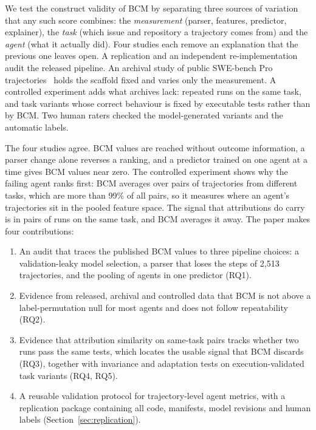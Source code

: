 \documentclass[conference]{IEEEtran}
\newcommand{\bcm}{\textsc{BCM}}
\begin{document}
We test the construct validity of \bcm{} by separating three sources of variation that any such score combines: the \emph{measurement} (parser, features, predictor, explainer), the \emph{task} (which issue and repository a trajectory comes from) and the \emph{agent} (what it actually did). Four studies each remove an explanation that the previous one leaves open. A replication and an independent re-implementation audit the released pipeline. An archival study of public SWE-bench Pro trajectories~\cite{deng2025swebenchpro} holds the scaffold fixed and varies only the measurement. A controlled experiment adds what archives lack: repeated runs on the same task, and task variants whose correct behaviour is fixed by executable tests rather than by \bcm. Two human raters checked the model-generated variants and the automatic labels.

The four studies agree. \bcm{} values are reached without outcome information, a parser change alone reverses a ranking, and a predictor trained on one agent at a time gives \bcm{} values near zero. The controlled experiment shows why the failing agent ranks first: \bcm{} averages over pairs of trajectories from different tasks, which are more than 99\% of all pairs, so it measures where an agent's trajectories sit in the pooled feature space. The signal that attributions do carry is in pairs of runs on the same task, and \bcm{} averages it away. The paper makes four contributions:
\begin{enumerate}
\item An audit that traces the published \bcm{} values to three pipeline choices: a validation-leaky model selection, a parser that loses the steps of 2{,}513 trajectories, and the pooling of agents in one predictor (RQ1).
\item Evidence from released, archival and controlled data that \bcm{} is not above a label-permutation null for most agents and does not follow repeatability (RQ2).
\item Evidence that attribution similarity on same-task pairs tracks whether two runs pass the same tests, which locates the usable signal that \bcm{} discards (RQ3), together with invariance and adaptation tests on execution-validated task variants (RQ4, RQ5).
\item A reusable validation protocol for trajectory-level agent metrics, with a replication package containing all code, manifests, model revisions and human labels (Section~\ref{sec:replication}).
\end{enumerate}
\end{document}
